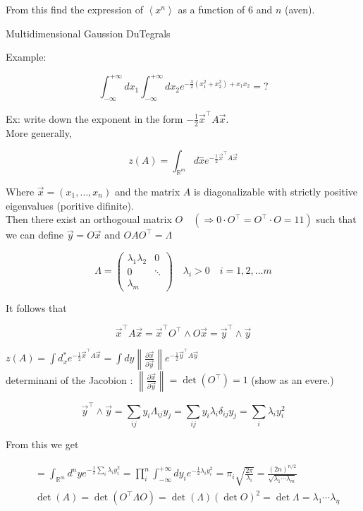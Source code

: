 \documentclass[10pt]{article}
\begin{document}
From this find the expression of $\left\langle x^{n}\right\rangle$ as a function of 6 and $n$ (aven).

Multidimensional Gaussion DuTegrals

Example:

$$
\int_{-\infty}^{+\infty} d x_{1} \int_{-\infty}^{+\infty} d x_{2} e^{-\frac{3}{2}\left(x_{1}^{2}+x_{2}^{2}\right)+x_{1} x_{2}}=?
$$

Ex: write down the exponent in the form $-\frac{1}{2} \vec{x}^{\top} A \vec{x}$.\\
More generally,

$$
z(A)=\int_{\mathbb{R}^{m}} d \hat{x} e^{-\frac{1}{2} \vec{x}^{\top} A \vec{x}}
$$

Where $\vec{x}=\left(x_{1}, \ldots, x_{n}\right)$ and the matrix $A$ is diagonalizable with strictly positive eigenvalues (poritive difinite).\\
Then there exist an orthogoual matrix $O \quad\left(\Rightarrow 0 \cdot O^{\top}=O^{\top} \cdot O=11\right)$ such that we can define $\vec{y}=O \vec{x}$ and $O A O^{\top}=\Lambda$

$$
\Lambda=\left(\begin{array}{cc}
\lambda_{1} \lambda_{2} & 0 \\
0 & \ddots \\
\lambda_{m}
\end{array}\right) \quad \lambda_{i}>0 \quad i=1,2, \ldots m
$$

It follows that

$$
\vec{x}^{\top} A \vec{x}=\vec{x}^{\top} O^{\top} \wedge O \vec{x}=\vec{y}^{\top} \wedge \vec{y}
$$

$z(A)=\int d_{x}^{*} e^{-\frac{1}{2} \vec{x}^{\top} A \vec{x}}=\int d y\left\|\frac{\partial \vec{x}}{\partial \vec{y}}\right\| e^{-\frac{1}{2} \vec{y}^{\top} A \vec{y}}$\\
determinani of the Jacobion : $\left\|\frac{\partial \vec{x}}{\partial \vec{y}}\right\|=\operatorname{det}\left(O^{\top}\right)=1$ (show as an evere.)

$$
\vec{y}^{\top} \wedge \vec{y}=\sum_{i j} y_{i} \Lambda_{i j} y_{j}=\sum_{i j} y_{i} \lambda_{i} \delta_{i j} y_{j}=\sum_{i} \lambda_{i} y_{i}^{2}
$$

From this we get

$$
\begin{aligned}
& =\int_{\mathbb{R}^{m}} d^{n} y e^{-\frac{1}{2} \sum_{i} \lambda_{i} y_{i}^{2}}=\prod_{i}^{n} \int_{-\infty}^{+\infty} d y_{i} e^{-\frac{1}{2} \lambda_{i} y_{i}^{2}}=\pi_{i} \sqrt{\frac{2 \pi}{\lambda_{i}}}=\frac{(2 n)^{n / 2}}{\sqrt{\lambda_{1} \cdots \lambda_{m}}} \\
& \operatorname{det}(A)=\operatorname{det}\left(O^{\top} \Lambda O\right)=\operatorname{det}(\Lambda)(\operatorname{det} O)^{2}=\operatorname{det} \Lambda=\lambda_{1} \cdots \lambda_{\eta}
\end{aligned}
$$
\end{document}
